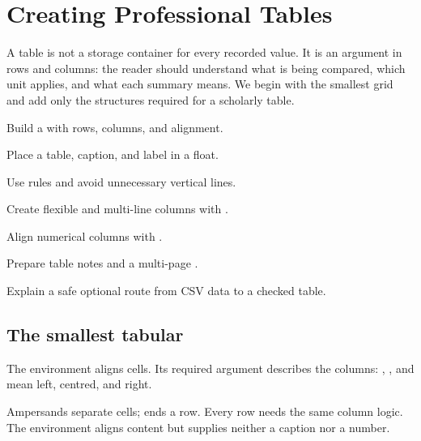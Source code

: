 \chapter{Creating Professional Tables}
\label{chap:tables}

A table is not a storage container for every recorded value. It is an argument
in rows and columns: the reader should understand what is being compared, which
unit applies, and what each summary means. We begin with the smallest grid and
add only the structures required for a scholarly table.

\begin{learningoutcomes}
  \item Build a  with rows, columns, and alignment.
  \item Place a table, caption, and label in a float.
  \item Use  rules and avoid unnecessary vertical lines.
  \item Create flexible and multi-line columns with .
  \item Align numerical columns with .
  \item Prepare table notes and a multi-page .
  \item Explain a safe optional route from CSV data to a checked table.
\end{learningoutcomes}

\section{The smallest tabular}

The  environment aligns cells. Its required argument describes
the columns: , , and  mean left, centred, and right.


Ampersands separate cells; \code{\\} ends a row. Every row needs the same
column logic. The environment aligns content but supplies neither a caption nor
a number.

